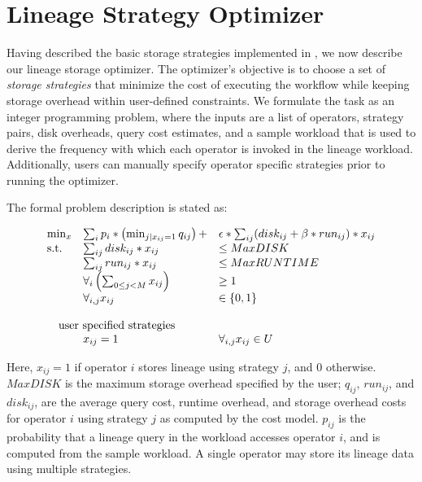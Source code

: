 
\section{Lineage Strategy Optimizer}
\label{s:optimizer}

Having described the basic storage strategies implemented in \sys{},
we now describe our lineage storage optimizer.
The optimizer's objective is to choose a set of {\it storage strategies} that
minimize the cost of executing the workflow while keeping storage overhead
within user-defined constraints.  We formulate the task as an integer
programming problem, where the inputs are a list of operators, strategy pairs,
disk overheads, query cost estimates, and a sample workload that is used to
derive the frequency with which each operator is invoked in the lineage
workload.  Additionally, users can manually specify operator specific
strategies prior to running the optimizer. 


The formal problem description is stated as:

{\footnotesize
\[
\begin{array}{l l l}
\min_x          & \sum_i p_i * \left(\min_{j|x_{ij}=1} q_{ij}\right) +
&\epsilon * \sum_{ij} (disk_{ij} + \beta * run_{ij}) * x_{ij} \\
\mbox{s.t.}   &\sum_{ij} disk_{ij} * x_{ij} &\leq MaxDISK\\
              &\sum_{ij} run_{ij} * x_{ij} &\leq MaxRUNTIME\\
              &\forall_{i} \left(\sum_{0 \leq j < M} x_{ij}\right) &\ge 1\\
              &\forall_{i,j} x_{ij} &\in \{0, 1\} \\
&&\\
              &\hspace*{-.3in}  {\rm user\ specified\ strategies}&\\
              &x_{ij} = 1 &\forall_{i,j} x_{ij} \in U
\end{array}
\]
}

Here, $x_{ij} = 1$ if operator $i$ stores lineage using strategy $j$, and 0
otherwise.  $MaxDISK$ is the maximum storage overhead specified by the user;
$q_{ij}$, $run_{ij}$, and $disk_{ij}$, are the average query cost, runtime
overhead, and storage overhead costs for operator $i$ using strategy $j$ as
computed by the cost model.  $p_{ij}$ is the probability that a lineage
query in the workload accesses operator $i$, and is computed from the sample
workload.  A single operator may store its lineage data using multiple
strategies.

